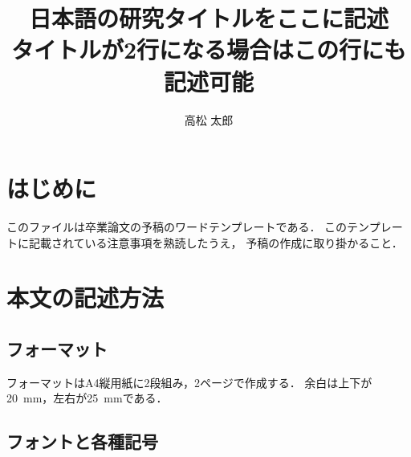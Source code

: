 \documentclass[a4j]{jsarticle}
\title{日本語の研究タイトルをここに記述\\タイトルが2行になる場合はこの行にも記述可能}
\author{高松 太郎}
\begin{document}
\maketitle%



\thispagestyle{empty}
\pagestyle{empty}

\section{はじめに}

このファイルは卒業論文の予稿のワードテンプレートである．
このテンプレートに記載されている注意事項を熟読したうえ，
予稿の作成に取り掛かること．

\section{本文の記述方法}

\subsection{フォーマット}

フォーマットはA4縦用紙に2段組み，2ページで作成する．
余白は上下が20~mm，左右が25~mmである．

\subsection{フォントと各種記号}
\end{document}
